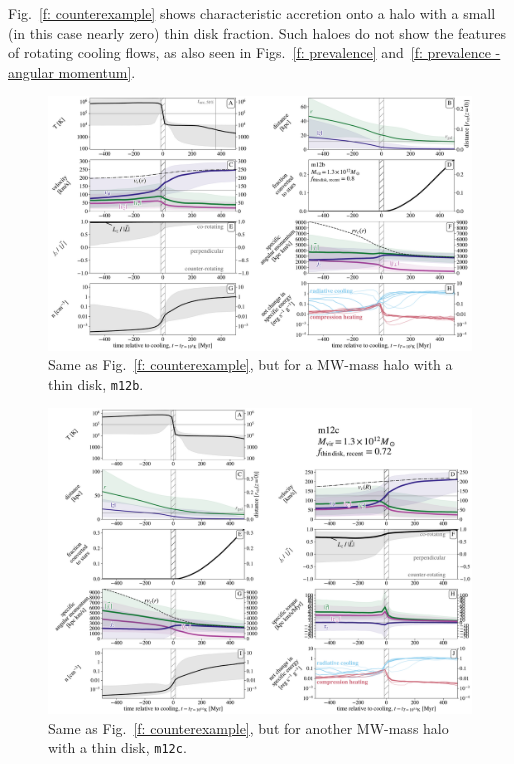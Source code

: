 \documentclass[fleqn,usenatbib]{mnras}
\begin{document}
Fig.~\ref{f: counterexample} shows characteristic accretion onto a halo with a small (in this case nearly zero) thin disk fraction.
Such haloes do not show the features of rotating cooling flows, as also seen in Figs.~\ref{f: prevalence} and~\ref{f: prevalence - angular momentum}.


\begin{figure}
\includegraphics[width=\textwidth]{figures/before_and_after/before_and_after_allone_m12b_md.pdf}
\caption{
Same as Fig.~\ref{f: counterexample}, but for a MW-mass halo with a thin disk, \texttt{m12b}.
}
\label{f: before and after m12b}
\end{figure}

\begin{figure}
\includegraphics[width=\textwidth]{figures/before_and_after/before_and_after_allone_m12c_md.pdf}
\caption{
Same as Fig.~\ref{f: counterexample}, but for another MW-mass halo with a thin disk, \texttt{m12c}.
}
\label{f: before and after m12c}
\end{figure}
\end{document}
